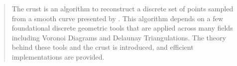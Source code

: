 \begin{abstract}
	The crust is an algorithm to reconstruct a discrete set of points sampled from a smooth curve presented by \citet{crust}.
	This algorithm depends on a few foundational discrete geometric tools that are applied across many fields including Voronoi Diagrams and Delaunay Triangulations.
	The theory behind these tools and the crust is introduced, and efficient implementations are provided.
\end{abstract}
